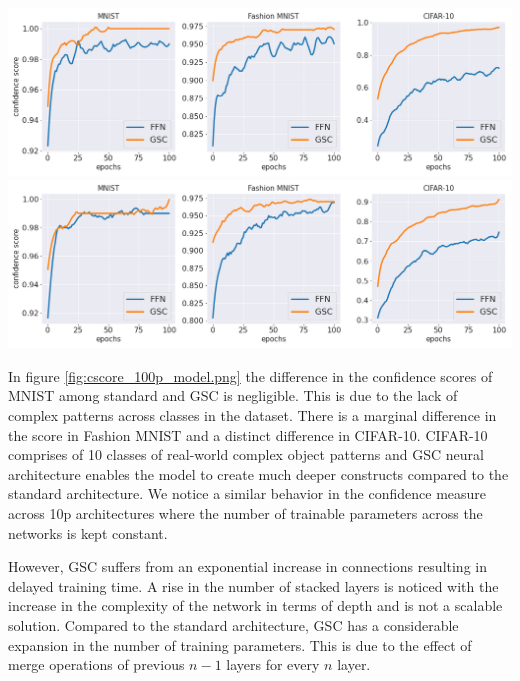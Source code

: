 \documentclass{article}
\begin{document}
\noindent\begin{minipage}{.5\textwidth}
   \centering
   \includegraphics[scale=0.2]{paper/cscore_100p_param.png}
   \label{fig:cscore_100p_model.png}
   \centering
   \includegraphics[scale=0.2]{paper/cscore_10p_param.png}
   \label{fig:cscore_10p_model.png}
\end{minipage}
\begin{minipage}{.4\textwidth}
In figure \ref{fig:cscore_100p_model.png} the difference in the confidence scores of MNIST among standard and GSC is negligible. This is due to the lack of complex patterns across classes in the dataset. There is a marginal difference in the score in Fashion MNIST and a distinct difference in CIFAR-10. CIFAR-10 comprises of 10 classes of real-world complex object patterns and GSC neural architecture enables the model to create much deeper constructs compared to the standard architecture. We notice a similar behavior in the confidence measure across 10p architectures where the number of trainable parameters across the networks is kept constant.
\end{minipage}


However, GSC suffers from an exponential increase in connections resulting in delayed training time. A rise in the number of stacked layers is noticed with the increase in the complexity of the network in terms of depth and is not a scalable solution. Compared to the standard architecture, GSC has a considerable expansion in the number of training parameters. This is due to the effect of merge operations of previous $n-1$ layers for every $n$ layer.
\end{document}
